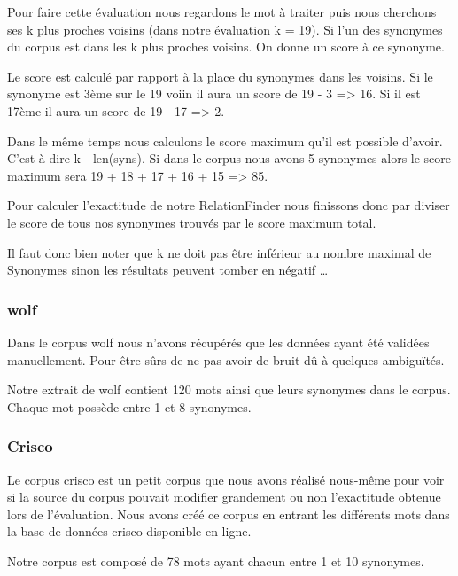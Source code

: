 Pour faire cette évaluation nous regardons le mot à traiter puis nous cherchons 
ses k plus proches voisins (dans notre évaluation k = 19). Si l'un des 
synonymes du corpus est dans les k plus proches voisins. On donne un score à ce 
synonyme.

Le score est calculé par rapport à la place du synonymes dans les voisins. Si 
le synonyme est 3ème sur le 19 voiin il aura un score de 19 - 3 => 16. Si il 
est 17ème il aura un score de 19 - 17 => 2.

Dans le même temps nous calculons le score maximum qu'il est possible d'avoir. 
C'est-à-dire k - len(syns). Si dans le corpus nous avons 5 synonymes alors le 
score maximum sera 19 + 18 + 17 + 16 + 15 => 85.

Pour calculer l'exactitude de notre RelationFinder nous finissons donc par 
diviser le score de tous nos synonymes trouvés par le score maximum total.

Il faut donc bien noter que k ne doit pas être inférieur au nombre maximal de 
Synonymes sinon les résultats peuvent tomber en négatif \dots

\subsubsection{wolf}

Dans le corpus wolf nous n'avons récupérés que les données ayant été validées 
manuellement. Pour être sûrs de ne pas avoir de bruit dû à quelques ambiguïtés.

Notre extrait de wolf contient 120 mots ainsi que leurs synonymes dans le 
corpus. Chaque mot possède entre 1 et 8 synonymes.

\subsubsection{Crisco}

Le corpus crisco est un petit corpus que nous avons réalisé nous-même pour voir 
si la source du corpus pouvait modifier grandement ou non l'exactitude obtenue 
lors de l'évaluation. Nous avons créé ce corpus en entrant les différents mots 
dans la base de données crisco disponible en ligne.

Notre corpus est composé de 78 mots ayant chacun entre 1 et 10 synonymes.
